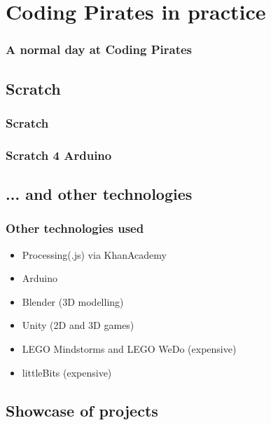 \documentclass{beamer}
\begin{document}
\section{Coding Pirates in practice}
\begin{frame}
\frametitle{A normal day at Coding Pirates}

\end{frame}


\subsection{Scratch}
\begin{frame}
\frametitle{Scratch}

\end{frame}

\begin{frame}
\frametitle{Scratch 4 Arduino}

\end{frame}



\subsection{... and other technologies}
\begin{frame}

\frametitle{Other technologies used}

\begin{itemize}
\item Processing(.js) via KhanAcademy
\item Arduino
\item Blender (3D modelling)
\item Unity (2D and 3D games)
\item LEGO Mindstorms and LEGO WeDo (expensive)
\item littleBits (expensive)
\end{itemize}
\end{frame}

\subsection{Showcase of projects}
\end{document}
